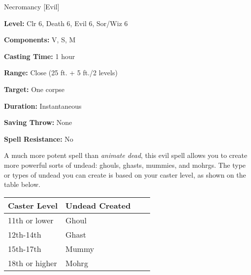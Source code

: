 
Necromancy [Evil]

\textbf{Level:} Clr 6, Death 6, Evil 6, Sor/Wiz 6

\textbf{Components:} V, S, M

\textbf{Casting Time:} 1 hour

\textbf{Range:} Close (25 ft. + 5 ft./2 levels)

\textbf{Target:} One corpse

\textbf{Duration:} Instantaneous

\textbf{Saving Throw:} None

\textbf{Spell Resistance:} No

A much more potent spell than \textit{animate dead}, this evil spell allows you 
to create more powerful sorts of undead: ghouls, ghasts, mummies, and mohrgs. The 
type or types of undead you can create is based on your caster level, as shown 
on the table below.

\begin{longtable}{llll}
\hline
\multicolumn{1}{|p{0.938in}|}{\begin{minipage}[t]{0.938in}\raggedright
\textbf{Caster Level}\end{minipage}} & \multicolumn{1}{p{1.126in}|}{\begin{minipage}[t]{1.126in}\raggedright
\textbf{Undead Created}\end{minipage}}\\
\hline
\multicolumn{1}{p{0.069in}|}{\begin{minipage}[t]{0.069in}\raggedright
11th or lower\end{minipage}} & \multicolumn{1}{p{0.069in}|}{\begin{minipage}[t]{0.069in}\raggedright
Ghoul\end{minipage}}\\
\hline
\multicolumn{1}{|p{0.938in}|}{\begin{minipage}[t]{0.938in}\raggedright
12th-14th\end{minipage}} & \multicolumn{1}{p{1.126in}|}{\begin{minipage}[t]{1.126in}\raggedright
Ghast\end{minipage}}\\
\hline
\multicolumn{1}{p{0.069in}|}{\begin{minipage}[t]{0.069in}\raggedright
15th-17th\end{minipage}} & \multicolumn{1}{p{0.069in}|}{\begin{minipage}[t]{0.069in}\raggedright
Mummy\end{minipage}}\\
\hline
\multicolumn{1}{|p{0.938in}|}{\begin{minipage}[t]{0.938in}\raggedright
18th or higher\end{minipage}} & \multicolumn{3}{p{1.265in}|}{\begin{minipage}[t]{1.265in}\raggedright
Mohrg\end{minipage}}\\
\hline
\end{longtable}

